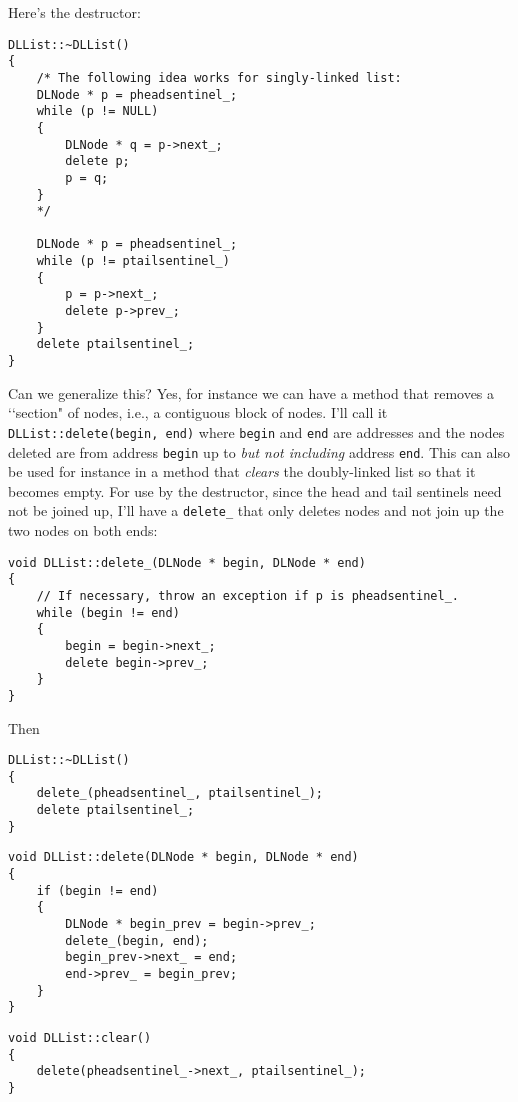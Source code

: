 Here's the destructor:
\begin{Verbatim}[frame=single,fontsize=\footnotesize]
DLList::~DLList()
{
    /* The following idea works for singly-linked list:
    DLNode * p = pheadsentinel_;
    while (p != NULL)
    {
        DLNode * q = p->next_;
        delete p;
        p = q;
    }
    */

    DLNode * p = pheadsentinel_;
    while (p != ptailsentinel_)
    {
        p = p->next_;        
        delete p->prev_;
    }
    delete ptailsentinel_;
}
\end{Verbatim}
Can we generalize this?
Yes, for instance we can have a method that removes a \lq\lq section"
of nodes, i.e., a contiguous block of nodes.
I'll call it \verb!DLList::delete(begin, end)! where \verb!begin!
and \verb!end! are addresses and the nodes deleted
are from address \verb!begin! up to \textit{but not including} address \verb!end!.
This can also be used for instance in a method that \textit{clears} the
doubly-linked list so that it becomes empty.
For use by the destructor, since the head and tail sentinels
need not be joined up, I'll have a \verb!delete_! that only
deletes nodes and not join up the two nodes on both ends:
\begin{Verbatim}[frame=single,fontsize=\footnotesize]
void DLList::delete_(DLNode * begin, DLNode * end)
{
    // If necessary, throw an exception if p is pheadsentinel_.
    while (begin != end)
    {
        begin = begin->next_;        
        delete begin->prev_;
    }
}
\end{Verbatim}
Then
\begin{Verbatim}[frame=single,fontsize=\footnotesize]
DLList::~DLList()
{
    delete_(pheadsentinel_, ptailsentinel_);
    delete ptailsentinel_;
}
\end{Verbatim}
\begin{Verbatim}[frame=single,fontsize=\footnotesize]
void DLList::delete(DLNode * begin, DLNode * end)
{
    if (begin != end)
    {
        DLNode * begin_prev = begin->prev_;
        delete_(begin, end);
        begin_prev->next_ = end;
        end->prev_ = begin_prev;
    }
}
\end{Verbatim}
\begin{Verbatim}[frame=single,fontsize=\footnotesize]
void DLList::clear()
{
    delete(pheadsentinel_->next_, ptailsentinel_);
}
\end{Verbatim}


